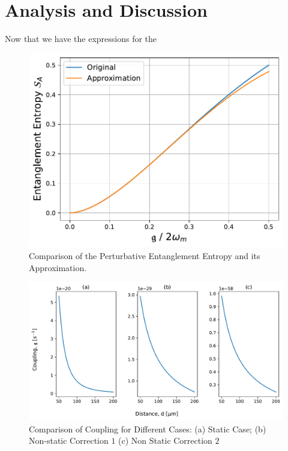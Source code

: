 \documentclass[12pt,a4paper]{report}
\theoremstyle{plain}
\theoremstyle{definition}
\theoremstyle{remark}
\begin{document}
\chapter{Analysis and Discussion} \label{chap: Analysis}
Now that we have the expressions for the 
\begin{figure}[htb]
    \centering
    \includegraphics[width=12cm]{EEApprox.pdf}
    \caption{Comparison of the Perturbative Entanglement Entropy and its Approximation.}
    \label{fig: EE1}
\end{figure}
\begin{figure}[htb]
    \centering
    \includegraphics[width=15cm]{Coupling.pdf}
    \caption{Comparison of Coupling for Different Cases:  (a) Static Case; (b) Non-static Correction $1$ (c) Non Static Correction $2$}
    \label{fig:Coupling}
\end{figure}
\end{document}
